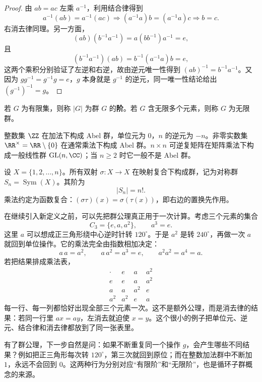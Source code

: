 \begin{proof}
由 $ab=ac$ 左乘 $a^{-1}$，利用结合律得到
\[
a^{-1}(ab)=a^{-1}(ac)
\Longrightarrow
(a^{-1}a)b=(a^{-1}a)c
\Longrightarrow b=c.
\]
右消去律同理。另一方面，
\[
(ab)(b^{-1}a^{-1})
=a(bb^{-1})a^{-1}=e,
\]
且
\[
(b^{-1}a^{-1})(ab)
=b^{-1}(a^{-1}a)b=e,
\]
这两个乘积分别验证了左逆和右逆，故由逆元唯一性得到 $(ab)^{-1}=b^{-1}a^{-1}$。又因为 $gg^{-1}=g^{-1}g=e$，$g$ 本身就是 $g^{-1}$ 的逆元，同一唯一性结论给出 $(g^{-1})^{-1}=g$。
\end{proof}

\begin{definition}[群的阶]
若 $G$ 为有限集，则称 $\lvert G\rvert$ 为群 $G$ 的\textbf{阶}。若 $G$ 含无限多个元素，则称 $G$ 为无限群。
\label{def:group-order}
\end{definition}

整数集 $\ZZ$ 在加法下构成 Abel 群，单位元为 $0$，$n$ 的逆元为 $-n$。非零实数集 $\RR^{\times}=\RR\setminus\{0\}$ 在通常乘法下构成 Abel 群。$n\times n$ 可逆复矩阵在矩阵乘法下构成一般线性群 $\operatorname{GL}(n,\CC)$；当 $n\ge 2$ 时它一般不是 Abel 群。


\begin{definition}[{置换群}]
设 $X=\{1,2,\dots,n\}$。所有双射 $\sigma:X\to X$ 在映射复合下构成群，记为对称群 $S_n=\operatorname{Sym}(X)$。其阶为
\[
\lvert S_n\rvert=n!.
\]
乘法约定为函数复合：$(\sigma\tau)(x)=\sigma(\tau(x))$，即右边的置换先作用。
\end{definition}

在继续引入新定义之前，可以先把群公理真正用于一次计算。考虑三个元素的集合
\[
C_3=\{e,a,a^2\},\qquad a^3=e.
\]
这里 $a$ 可以想成正三角形绕中心逆时针转 $120^\circ$。于是 $a^2$ 是转 $240^\circ$，再做一次 $a$ 就回到单位操作。它的乘法完全由指数相加决定：
\[
a\,a=a^2,\qquad a\,a^2=a^3=e,\qquad a^2a^2=a^4=a.
\]
若把结果排成乘法表，
\[
\begin{array}{c|ccc}
\cdot&e&a&a^2\\\hline
e&e&a&a^2\\
a&a&a^2&e\\
a^2&a^2&e&a
\end{array}
\]
每一行、每一列都恰好出现全部三个元素一次。这不是额外公理，而是消去律的结果：若同一行里 $ax=ay$，左消去就迫使 $x=y$。这个很小的例子把单位元、逆元、结合律和消去律都放到了同一张表里。

有了群公理，下一步自然是问：如果不断重复同一个操作 $g$，会产生哪些不同结果？例如把正三角形每次转 $120^\circ$，第三次就回到原位；而在整数加法群中不断加 $1$，永远不会回到 $0$。这两种行为分别对应“有限阶”和“无限阶”，也是循环子群概念的来源。

